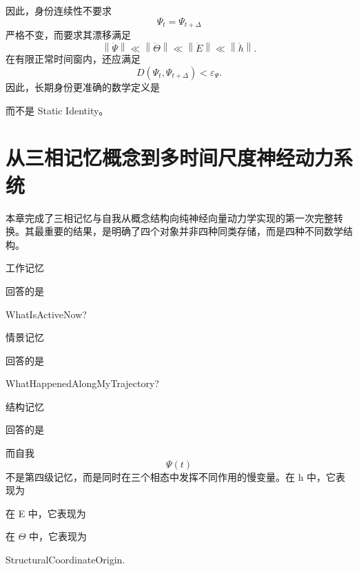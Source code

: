 因此，身份连续性不要求
\[
\Psi_t
=
\Psi_{t+\Delta}
\]
严格不变，而要求其漂移满足
\[
\left\|
\dot\Psi
\right\|
\ll
\left\|
\dot\Theta
\right\|
\ll
\left\|
\dot E
\right\|
\ll
\left\|
\dot h
\right\|.
\]
在有限正常时间窗内，还应满足
\[
D
\left(
\Psi_t,\Psi_{t+\Delta}
\right)
<
\varepsilon_\Psi.
\]
因此，长期身份更准确的数学定义是
\begin{statementbox}
\centering
{}
\end{statementbox}
而不是 Static Identity。

\section{从三相记忆概念到多时间尺度神经动力系统}

本章完成了三相记忆与自我从概念结构向纯神经向量动力学实现的第一次完整转换。其最重要的结果，是明确了四个对象并非四种同类存储，而是四种不同数学结构。

工作记忆
\begin{statementbox}
\centering
{}
\end{statementbox}
回答的是
\begin{statementbox}
WhatIsActiveNow?
\end{statementbox}

情景记忆
\begin{statementbox}
\centering
{}
\end{statementbox}
回答的是
\begin{statementbox}
WhatHappenedAlongMyTrajectory?
\end{statementbox}

结构记忆
\begin{statementbox}
\centering
{}
\end{statementbox}
回答的是
\begin{statementbox}
\centering
{}
\end{statementbox}

而自我
\[
\boxed{
\Psi(t)
}
\]
不是第四级记忆，而是同时在三个相态中发挥不同作用的慢变量。在 h 中，它表现为
\begin{statementbox}
\centering
{}
\end{statementbox}
在 E 中，它表现为
\begin{statementbox}
\centering
{}
\end{statementbox}
在 $\Theta$ 中，它表现为
\begin{statementbox}
StructuralCoordinateOrigin.
\end{statementbox}

